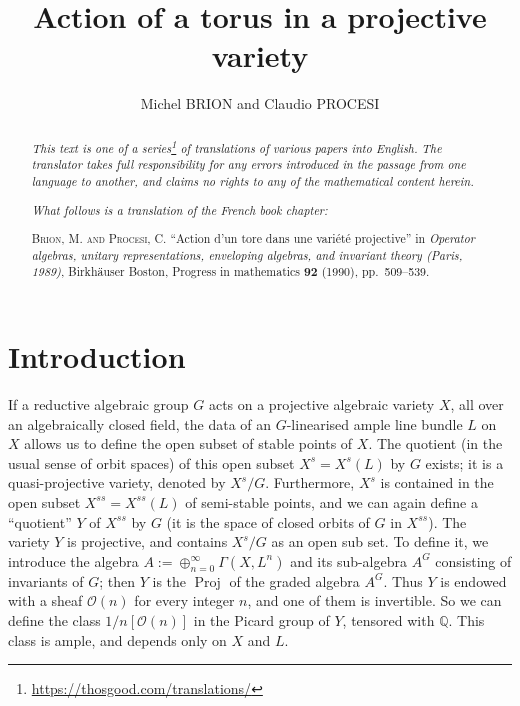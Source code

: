\documentclass{article}
\title{Action of a torus in a projective variety}
\author{Michel BRION and Claudio PROCESI}
\date{}
\newcommand{\sh}{\mathscr}
\DeclareMathOperator{\Proj}{Proj}
\begin{document}
\maketitle
\thispagestyle{fancy}

\renewcommand{\abstractname}{Translator's note.}

\begin{abstract}
  \renewcommand*{\thefootnote}{\fnsymbol{footnote}}
  \emph{This text is one of a series\footnote{\url{https://thosgood.com/translations/}} of translations of various papers into English.}
  \emph{The translator takes full responsibility for any errors introduced in the passage from one language to another, and claims no rights to any of the mathematical content herein.}
  
  \emph{What follows is a translation of the French book chapter:}

  \medskip\noindent
  \textsc{Brion, M. and Procesi, C.}
  ``Action d'un tore dans une vari\'{e}t\'{e} projective''
  in \emph{Operator algebras, unitary representations, enveloping algebras, and invariant theory (Paris, 1989)}, Birkh\"{a}user Boston, Progress in mathematics \textbf{92} (1990), pp.~509--539.
\end{abstract}

\setcounter{footnote}{0}

\tableofcontents
\bigskip



\section*{Introduction}
\label{introduction}

If a reductive algebraic group $G$ acts on a projective algebraic variety $X$, all over an algebraically closed field, the data of an $G$-linearised ample line bundle $L$ on $X$ allows us to define the open subset of stable points of $X$.
The quotient (in the usual sense of orbit spaces) of this open subset $X^s=X^s(L)$ by $G$ exists;
it is a quasi-projective variety, denoted by $X^s/G$.
Furthermore, $X^s$ is contained in the open subset $X^{ss}=X^{ss}(L)$ of semi-stable points, and we can again define a ``quotient'' $Y$ of $X^{ss}$ by $G$ (it is the space of closed orbits of $G$ in $X^{ss}$).
The variety $Y$ is projective, and contains $X^s/G$ as an open sub set.
To define it, we introduce the algebra $A:=\oplus_{n=0}^\infty \Gamma(X,L^n)$ and its sub-algebra $A^G$ consisting of invariants of $G$;
then $Y$ is the $\Proj$ of the graded algebra $A^G$.
Thus $Y$ is endowed with a sheaf $\sh{O}(n)$ for every integer $n$, and one of them is invertible.
So we can define the class $1/n[\sh{O}(n)]$ in the Picard group of $Y$, tensored with $\mathbb{Q}$.
This class is ample, and depends only on $X$ and $L$.
\end{document}
